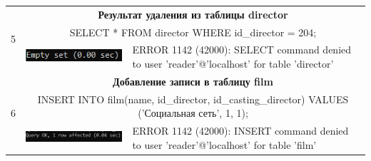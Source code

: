 \documentclass[11pt,a4paper,final]{article} %
\begin{document}
\begin{table}[H]
\begin{tabularx}{\textwidth}{|c|X|X|}
	\multirow{3}{*}{5} & \multicolumn{2}{c|}{\textbf{Результат удаления из таблицы director}}\\
	& \multicolumn{2}{c|}{SELECT * FROM director WHERE id\_director = 204;} \\
	\cline{2-3}
	& 
	\vspace{-6pt}
	\hspace{-8.5pt}
	\includegraphics[width=1\linewidth]{n3.png}
	& 
	\vspace{-6pt}
	\hspace{-8.5pt}
	ERROR 1142 (42000): SELECT command denied to user 'reader'@'localhost' for table 'director'
	\\
	\cline{1-3}
	
	
	\multirow{3}{*}{6} & \multicolumn{2}{c|}{\textbf{Добавление записи в таблицу film}}\\
	& \multicolumn{2}{c|}{\parbox{0.85\linewidth}{INSERT INTO film(name, id\_director, id\_casting\_director) VALUES \\ ('Социальная сеть', 1, 1);}} \\
	\cline{2-3}
	& 
	\vspace{-6pt}
	\hspace{-8.5pt}
	\includegraphics[width=1\linewidth]{e4.png}
	& 
	\vspace{-6pt}
	\hspace{-8.5pt}
	ERROR 1142 (42000): INSERT command denied to user 'reader'@'localhost' for table 'film'
	\\
	\cline{1-3}
	
	
	
\end{tabularx}
\end{table}
\end{document}

